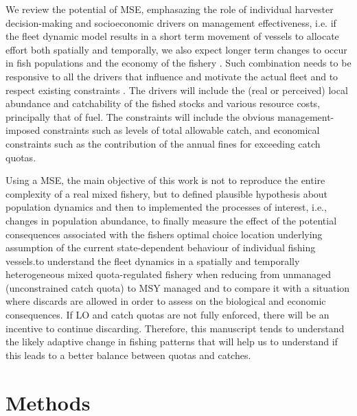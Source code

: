 \documentclass[12pt,oneline,a4paper,numbib]{ouparticle}
\numberwithin{equation}{subsection} %
\begin{document}
We review the potential of MSE, emphasazing the role of individual harvester decision-making and socioeconomic drivers on management effectiveness, i.e. if the fleet dynamic model results in a short term movement of vessels to allocate effort both spatially and temporally, we also expect longer term changes to occur in fish populations and the economy of the fishery \cite{Alzorriz2018}. Such combination needs to be responsive to all the drivers that influence and motivate the actual fleet and to respect existing constraints \cite{Venables2009}. The drivers will include the (real or perceived) local abundance and catchability of the fished stocks and various resource costs, principally that of fuel. The constraints will include the obvious management-imposed constraints such as levels of total allowable catch, and economical constraints such as the contribution of the annual fines for exceeding catch quotas.

Using a MSE, the main objective of this work is not to reproduce the entire complexity of a real mixed fishery, but to defined plausible hypothesis about population dynamics and then to implemented the processes of interest, i.e., changes in population abundance, to finally measure the effect of the potential consequences associated with the fishers optimal choice location underlying assumption of the current state-dependent behaviour of individual fishing vessels.to understand the fleet dynamics in a spatially and temporally heterogeneous mixed quota-regulated fishery when reducing from unmanaged (unconstrained catch quota) to MSY managed and to compare it with a situation where discards are allowed in order to assess on the biological and economic consequences. If LO and catch quotas are not fully enforced, there will be an incentive to continue discarding. Therefore, this manuscript tends to understand the likely adaptive change in fishing patterns that will help us to understand if this leads to a better balance between quotas and catches.



\section{Methods}
\label{sec2}
\end{document}
